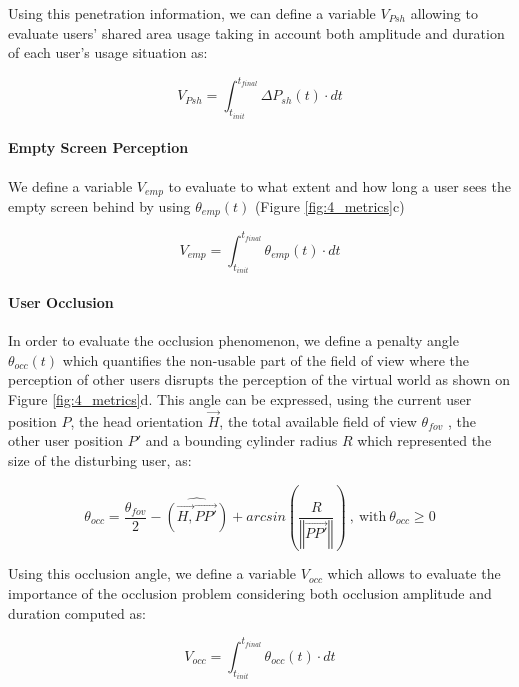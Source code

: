 Using this penetration information, we can define a variable $V_{Psh}$ allowing to evaluate users' shared area usage taking in account both amplitude and duration of each user's usage situation as:

\begin{equation}
V_{Psh}=\int_{t_{init}}^{t_{final}}\Delta P_{sh}(t)\cdot dt
\end{equation}

\paragraph{Empty Screen Perception}
We define a variable $V_{emp}$ to evaluate to what extent and how long a user sees the empty screen behind by using $\theta_{emp}(t)$ (Figure \ref{fig:4_metrics}c)

\begin{equation}
V_{emp}=\int_{t_{init}}^{t_{final}}\theta_{emp}(t)\cdot dt
\end{equation}

\paragraph{User Occlusion}
In order to evaluate the occlusion phenomenon, we define a penalty angle $\theta_{occ}(t)$ which quantifies the non-usable part of the field of view where the perception of other users disrupts the perception of the virtual world as shown on Figure \ref{fig:4_metrics}d. This angle can be expressed, using the current user position $P$, the head orientation $\overrightarrow{H}$, the total available field of view $\theta_{fov}$ , the other user position $P'$ and a bounding cylinder radius $R$ which represented the size of the disturbing user, as:

\begin{equation}
\theta_{occ}=\frac{\theta_{fov}}{2}-\widehat{(\overrightarrow{H,}\overrightarrow{PP'})}+arcsin(\frac{R}{\left\Vert \overrightarrow{PP'}\right\Vert })\mathrm{\:,\: with\:}\theta_{occ}\geq0
\end{equation}

Using this occlusion angle, we define a variable $V_{occ}$ which allows to evaluate the importance of the occlusion problem considering both occlusion amplitude and duration computed as:

\begin{equation}
V_{occ}=\int_{t_{init}}^{t_{final}}\theta_{occ}(t)\cdot dt
\end{equation}


